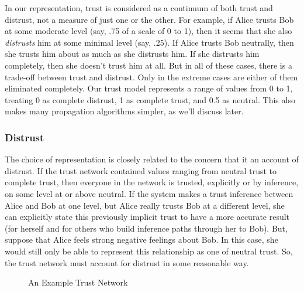 \documentclass{acm_proc_article-sp}
\begin{document}
In our representation, trust is considered as a continuum of both trust and distrust, not a measure of just one or the other.  For example, if Alice trusts Bob at some moderate level (say, .75 of a scale of 0 to 1), then it seems that she also \textit{distrusts} him at some minimal level (say, .25).  If Alice trusts Bob neutrally, then she trusts him about as much as she distrusts him.  If she distrusts him completely, then she doesn't trust him at all.  But in all of these cases, there is a trade-off between trust and distrust.  Only in the extreme cases are either of them eliminated completely.  Our trust model represents a range of values from 0 to 1, treating 0 as complete distrust, 1 as complete trust, and 0.5 as neutral.  This also makes many propagation algorithms simpler, as we'll discuss later.

\subsubsection{Distrust}
The choice of representation is closely related to the concern that it an account of distrust.  If the trust network contained values ranging from neutral trust to complete trust, then everyone in the network is trusted, explicitly or by inference, on some level at or above neutral.  If the system makes a trust inference between Alice and Bob at one level, but Alice really trusts Bob at a different level, she can explicitly state this previously implicit trust to have a more accurate result (for herself and for others who build inference paths through her to Bob).  But, suppose that Alice feels strong negative feelings about Bob.  In this case, she would still only be able to represent this relationship as one of neutral trust.  So, the trust network must account for distrust in some reasonable way.

\begin{figure}[thp]
\centering
{}
\caption{An Example Trust Network}
\label{fig:trust}
\end{figure}
\end{document}
